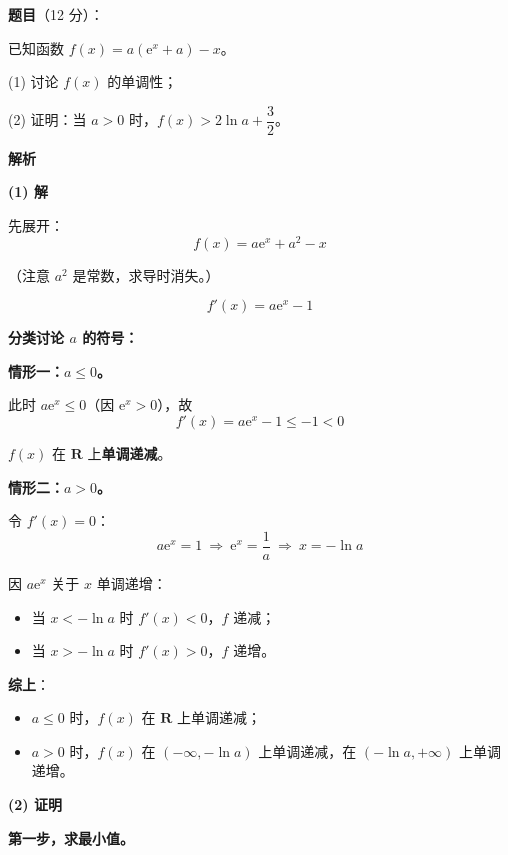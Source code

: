 \begin{answer}

\textbf{题目}（12 分）：

已知函数 $f(x)=a\left(\mathrm e^{x}+a\right)-x$。

  (1) 讨论 $f(x)$ 的单调性；

  (2) 证明：当 $a>0$ 时，$f(x)>2\ln a+\dfrac32$。

\textbf{解析}

\par\medskip

\textbf{(1) 解}

先展开：
\nopagebreak[4]
\[f(x)=a\mathrm e^{x}+a^{2}-x\]

（注意 $a^{2}$ 是常数，求导时消失。）

\nopagebreak[4]
\[f'(x)=a\mathrm e^{x}-1\]

\textbf{分类讨论 $a$ 的符号：}

\textbf{情形一：$a\le0$。}

此时 $a\mathrm e^{x}\le0$（因 $\mathrm e^{x}>0$），故
\nopagebreak[4]
\[f'(x)=a\mathrm e^{x}-1\le-1<0\]

$f(x)$ 在 $\mathbf R$ 上\textbf{单调递减}。

\textbf{情形二：$a>0$。}

令 $f'(x)=0$：
\nopagebreak[4]
\[a\mathrm e^{x}=1\ \Longrightarrow\ \mathrm e^{x}=\frac1a\ \Longrightarrow\ x=-\ln a\]

因 $a\mathrm e^{x}$ 关于 $x$ 单调递增：
\begin{itemize}
\item 当 $x<-\ln a$ 时 $f'(x)<0$，$f$ 递减；
\item 当 $x>-\ln a$ 时 $f'(x)>0$，$f$ 递增。
\end{itemize}

\textbf{综上}：
\begin{itemize}
\item $a\le0$ 时，$f(x)$ 在 $\mathbf R$ 上单调递减；
\item $a>0$ 时，$f(x)$ 在 $(-\infty,-\ln a)$ 上单调递减，在 $(-\ln a,+\infty)$ 上单调递增。
\end{itemize}

\par\medskip

\textbf{(2) 证明}

\textbf{第一步，求最小值。}


\end{answer}

